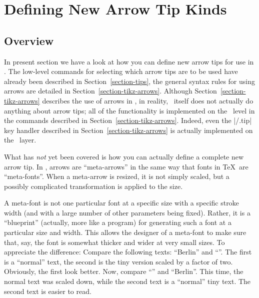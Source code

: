 %
%
%


\section[base-arrows]{Defining New Arrow Tip Kinds}
\label{section-arrows}

\subsection{Overview}

In present section we have a look at how you can define new arrow tips for use
in \pgfname. The low-level commands for selecting which arrow tips are to be
used have already been described in Section~\ref{section-tips}, the general
syntax rules for using arrows are detailed in
Section~\ref{section-tikz-arrows}. Although Section~\ref{section-tikz-arrows}
describes the use of arrows in \tikzname, in reality, \tikzname\ itself does
not actually do anything about arrow tips; all of the functionality is
implemented on the \pgfname\ level in the commands described in
Section~\ref{section-tikz-arrows}. Indeed, even the |/.tip| key handler
described in Section~\ref{section-tikz-arrows} is actually implemented on the
\pgfname\ layer.

What has \emph{not} yet been covered is how you can actually define a complete
new arrow tip. In \pgfname, arrows are ``meta-arrows'' in the same way that
fonts in \TeX\ are ``meta-fonts''. When a meta-arrow is resized, it is not
simply scaled, but a possibly complicated transformation is applied to the
size.

A meta-font is not one particular font at a specific size with a specific
stroke width (and with a large number of other parameters being fixed). Rather,
it is a ``blueprint'' (actually, more like a program) for generating such a
font at a particular size and width. This allows the designer of a meta-font to
make sure that, say, the font is somewhat thicker and wider at very small
sizes. To appreciate the difference: Compare the following texts: ``Berlin''
and ``''. The
first is a ``normal'' text, the second is the tiny version scaled by a factor
of two. Obviously, the first look better. Now, compare ``'' and ``{\tiny Berlin}''. This
time, the normal text was scaled down, while the second text is a ``normal''
tiny text. The second text is easier to read.

